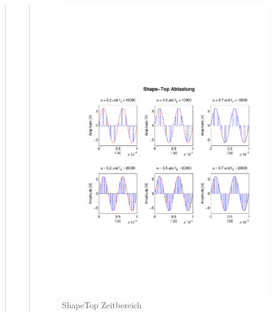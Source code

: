 \begin{quote}
\begin{quote}
        \begin{figure}[H]
            \centering
            \hspace{-3em}
            \includegraphics[scale=0.8, trim = 2cm 7cm 1cm 8cm, clip]{Bilder/ShapeTop_Sign}
            \caption{ShapeTop Zeitbereich}
            \label{fig:ShapeTop_Sign}
        \end{figure}
        

\end{quote}
\end{quote}
